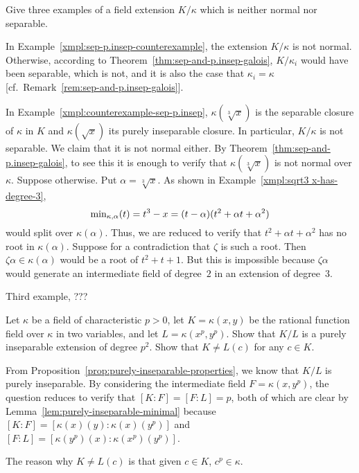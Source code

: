 \begin{probl}
    Give three examples of a field extension\/ $K/\kappa$ which is neither normal nor separable. 
\end{probl}

\begin{solution}
    In Example~\ref{xmpl:sep-p.insep-counterexample}, the extension $K/\kappa$ is not normal. Otherwise, according to Theorem~\ref{thm:sep-and-p.insep-galois}, $K/\kappa_i$ would have been separable, which is not, and it is also the case that $\kappa_i=\kappa$ [cf.~Remark~\ref{rem:sep-and-p.insep-galois}].

    In Example~\ref{xmpl:counterexample-sep-p.insep}, $\kappa(\sqrt[3]x)$ is the separable closure of $\kappa$ in $K$ and $\kappa(\sqrt x)$ its purely inseparable closure. In particular, $K/\kappa$ is not separable. We claim that it is not normal either. By Theorem~\ref{thm:sep-and-p.insep-galois}, to see this it is enough to verify that $\kappa(\sqrt[3]x)$ is not normal over $\kappa$. Suppose otherwise. Put $\alpha=\sqrt[3]x$. As shown in Example~\ref{xmpl:sqrt3 x-has-degree-3},
    $$
        \operatorname{min}_{\kappa,\alpha}(t)= t^3-x = (t-\alpha)(t^2+\alpha t+\alpha^2)
    $$
    would split over $\kappa(\alpha)$. Thus, we are reduced to verify that $t^2+\alpha t+\alpha^2$ has no root in $\kappa(\alpha)$. Suppose for a contradiction that $\zeta$ is such a root. Then $\zeta\alpha\in\kappa(\alpha)$ would be a root of $t^2+t+1$. But this  is impossible because $\zeta\alpha$ would generate an intermediate field of degree~$2$ in an extension of degree~$3$.

    Third example, ???
\end{solution}

\begin{probl}
    Let\/ $\kappa$ be a field of characteristic\/ $p > 0$, let\/ $K = \kappa(x, y)$ be the rational function field over\/ $\kappa$ in two variables, and let\/ $L = \kappa(x^p, y^p)$. Show that\/ $K / L$ is a purely inseparable extension of degree\/ $p^2$. Show that\/ $K \ne L(c)$ for any\/ $c \in K$.
\end{probl}

\begin{solution}
    From Proposition~\ref{prop:purely-inseparable-properties}, we know that $K/L$ is purely inseparable. By considering the intermediate field $F=\kappa(x,y^p)$, the question reduces to verify that $[K:F]=[F:L]=p$, both of which are clear by Lemma~\ref{lem:purely-inseparable-minimal} because $[K:F]=[\kappa(x)(y):\kappa(x)(y^p)]$ and $[F:L]=[\kappa(y^p)(x):\kappa(x^p)(y^p)]$.

    The reason why $K\ne L(c)$ is that given $c\in K$, $c^p\in\kappa$.
    
\end{solution}


